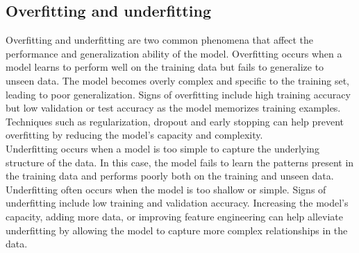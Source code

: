 
\subsection{Overfitting and underfitting}
Overfitting and underfitting are two common phenomena that affect the performance and generalization ability of the model. Overfitting occurs when a model learns to perform well on the training data but fails to generalize to unseen data. The model becomes overly complex and specific to the training set, leading to poor generalization. Signs of overfitting include high training accuracy but low validation or test accuracy as the model memorizes training examples. Techniques such as regularization, dropout and early stopping can help prevent overfitting by reducing the model's capacity and complexity. \\
Underfitting occurs when a model is too simple to capture the underlying structure of the data. In this case, the model fails to learn the patterns present in the training data and performs poorly both on the training and unseen data. Underfitting often occurs when the model is too shallow or simple. Signs of underfitting include low training and validation accuracy. Increasing the model's capacity, adding more data, or improving feature engineering can help alleviate underfitting by allowing the model to capture more complex relationships in the data.
